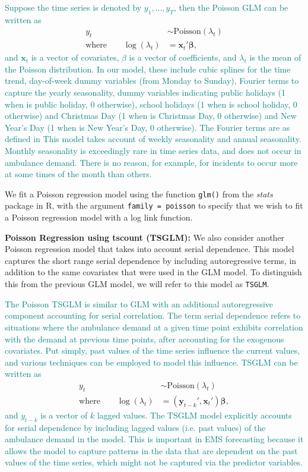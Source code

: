 \documentclass[
  authoryear,
  preprint,
  3p]{elsarticle}
\begin{document}
\textcolor{teal}{Suppose the time series is denoted by $y_1,\dots,y_T$, then the Poisson GLM can be written as}
\begin{align*}
  y_t &\sim \text{Poisson}(\lambda_t) \\
  \text{where}\qquad
  \log(\lambda_t) &= \bm{x}_t'\bm{\beta},
\end{align*}
\textcolor{teal}{and $\bm{x}_t$ is a vector of covariates, $\beta$ is a vector of coefficients, and $\lambda_t$ is the mean of the Poisson distribution. In our model, these include cubic splines for the time trend, day-of-week dummy variables (from Monday to Sunday), Fourier terms to capture the yearly seasonality, dummy variables indicating public holidays (1 when is public holiday, 0 otherwise), school holidays (1 when is school holiday, 0 otherwise) and Christmas Day (1 when is Christmas Day, 0 otherwise) and New Year's Day (1 when is New Year's Day, 0 otherwise). The Fourier terms are as defined in}
\citet[Section 7.4]{hyndman2021forecasting}
\textcolor{teal}{This model takes account of weekly seasonality and annual seasonality. Monthly seasonality is exceedingly rare in time series data, and does not occur in ambulance demand. There is no reason, for example, for incidents to occur more at some times of the month than others.}

We fit a Poisson regression model using the function \texttt{glm()} from
the \emph{stats} package in R, with the argument
\texttt{family\ =\ poisson} to specify that we wish to fit a Poisson
regression model with a log link function.

\textbf{Poisson Regression using tscount (TSGLM):} We also consider
another Poisson regression model that takes into account serial
dependence. This model captures the short range serial dependence by
including autoregressive terms, in addition to the same covariates that
were used in the GLM model. To distinguish this from the previous GLM
model, we will refer to this model as \texttt{TSGLM}.

\textcolor{teal}{The Poisson TSGLM is similar to GLM with an additional autoregressive component accounting for serial correlation. The term serial dependence refers to situations where the ambulance demand at a given time point exhibits correlation with the demand at previous time points, after accounting for the exogenous covariates. Put simply, past values of the time series influence the current values, and various techniques can be employed to model this influence. TSGLM can be written as}
\begin{align*}
  y_t &\sim \text{Poisson}(\lambda_t) \\
  \text{where}\qquad
  \log(\lambda_t) &= (\bm{y}_{t-k}' , \bm{x}_t')\bm{\beta},
\end{align*}
\textcolor{teal}{and ${y}_{t-k}$ is a vector of $k$ lagged values. The TSGLM model explicitly accounts for serial dependence by including lagged values (i.e. past values) of the ambulance demand in the model. This is important in EMS forecasting because it allows the model to capture patterns in the data that are dependent on the past values of the time series, which might not be captured via the predictor variables.}
\end{document}

